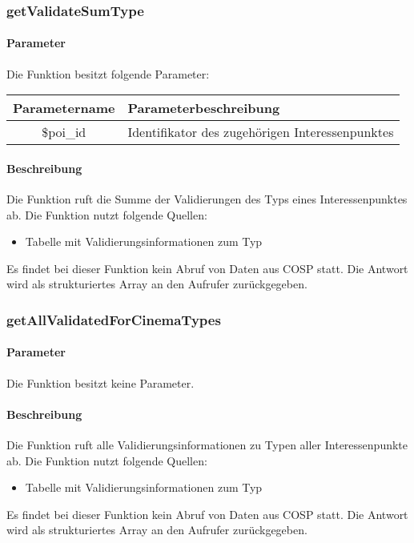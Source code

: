 \subsubsection{getValidateSumType}
\paragraph{Parameter} Die Funktion besitzt folgende Parameter:
\begin{table}[H]
	\begin{tabular}{|c|p{11cm}|}
		\hline
		\textbf{Parametername} & \textbf{Parameterbeschreibung} \\ \hline
		\$poi\_id & Identifikator des zugehörigen Interessenpunktes \\ \hline
	\end{tabular}
\end{table}
\paragraph{Beschreibung} Die Funktion ruft die Summe der Validierungen des Typs eines Interessenpunktes ab. Die Funktion nutzt folgende Quellen:
\begin{itemize}
	\item Tabelle mit Validierungsinformationen zum Typ
\end{itemize}
Es findet bei dieser Funktion kein Abruf von Daten aus {\glqq COSP\grqq} statt. Die Antwort wird als strukturiertes Array an den Aufrufer zurückgegeben.
\subsubsection{getAllValidatedForCinemaTypes}
\paragraph{Parameter} Die Funktion besitzt keine Parameter.
\paragraph{Beschreibung} Die Funktion ruft alle Validierungsinformationen zu Typen aller Interessenpunkte ab. Die Funktion nutzt folgende Quellen:
\begin{itemize}
	\item Tabelle mit Validierungsinformationen zum Typ
\end{itemize}
Es findet bei dieser Funktion kein Abruf von Daten aus {\glqq COSP\grqq} statt. Die Antwort wird als strukturiertes Array an den Aufrufer zurückgegeben.
